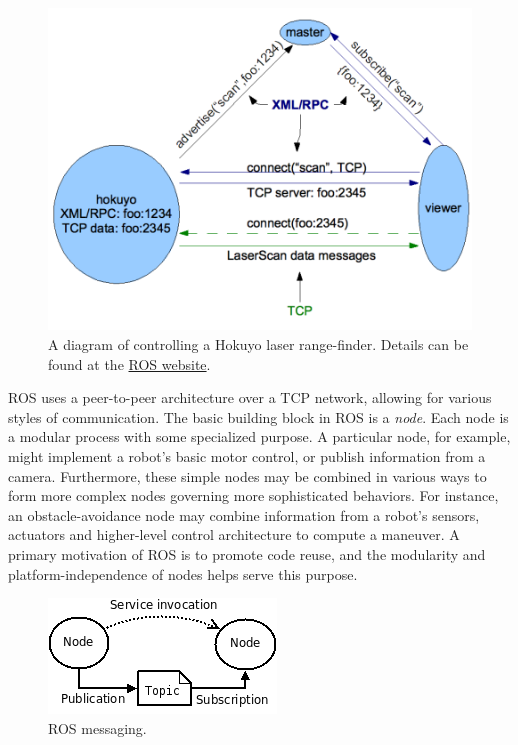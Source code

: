 \begin{figure}[!ht]
\centering
\includegraphics{figures/3_master-node-example.png}
\caption{\label{fig:master_node_example} A diagram of controlling a Hokuyo laser range-finder. Details can be found at the \href{http://www.ros.org/wiki/ROS/Technical\%20Overview}{ROS website}.}
\end{figure}

ROS uses a peer-to-peer architecture over a TCP network, allowing for
various styles of communication. The basic building block in ROS is
a \emph{node}.  Each node is a modular process with some specialized
purpose. A particular node, for example, might implement a robot's
basic motor control, or publish information from a camera.
Furthermore, these simple nodes may be combined in various ways to
form more complex nodes governing more sophisticated behaviors.  For
instance, an obstacle-avoidance node may combine information from a
robot's sensors, actuators and higher-level control architecture to
compute a maneuver.  A primary motivation of ROS is to promote code
reuse, and the modularity and platform-independence of nodes helps
serve this purpose.

\begin{figure}
\centering
\includegraphics[width=0.3\columnwidth]{figures/3_ros_messaging.png}
\caption{\label{fig:ros_messaging}ROS messaging.}
\end{figure}

